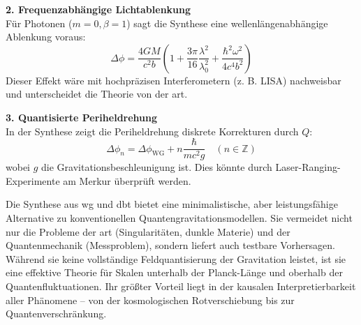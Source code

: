 \textbf{2. Frequenzabhängige Lichtablenkung}\\
Für Photonen ($m=0, \beta=1$) sagt die Synthese eine wellenlängenabhängige Ablenkung voraus:
\begin{equation}
    \Delta\phi = \frac{4GM}{c^2 b}\left(1 + \frac{3\pi}{16}\frac{\lambda^2}{\lambda_0^2} + \frac{\hbar^2 \omega^2}{4c^4 b^2}\right)
\end{equation}
Dieser Effekt wäre mit hochpräzisen Interferometern (z. B. LISA) nachweisbar und unterscheidet die Theorie von der \gls{art}.

\textbf{3. Quantisierte Periheldrehung}\\
In der Synthese zeigt die Periheldrehung diskrete Korrekturen durch $Q$:
\begin{equation}
    \Delta\phi_n = \Delta\phi_{\text{WG}} + n\frac{\hbar}{mc^2 g} \quad (n \in \mathbb{Z})    
\end{equation}
wobei $g$ die Gravitationsbeschleunigung ist. Dies könnte durch Laser-Ranging-Experimente am Merkur überprüft werden.

Die Synthese aus \gls{wg} und \gls{dbt} bietet eine minimalistische, aber leistungsfähige Alternative zu konventionellen Quantengravitationsmodellen. Sie vermeidet nicht nur
die Probleme der \gls{art} (Singularitäten, dunkle Materie) und der Quantenmechanik (Messproblem), sondern liefert auch testbare Vorhersagen. Während sie keine vollständige
Feldquantisierung der Gravitation leistet, ist sie eine effektive Theorie für Skalen unterhalb der Planck-Länge und oberhalb der Quantenfluktuationen. Ihr größter Vorteil
liegt in der kausalen Interpretierbarkeit aller Phänomene – von der kosmologischen Rotverschiebung bis zur Quantenverschränkung.
